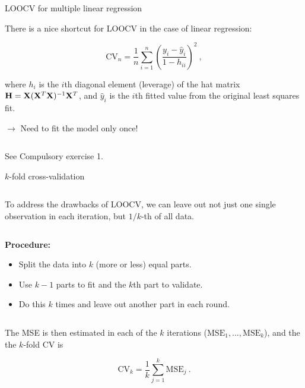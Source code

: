 \documentclass[10pt,ignorenonframetext,]{beamer}
\providecommand{\tightlist}{%
  \setlength{\itemsep}{0pt}\setlength{\parskip}{0pt}}
\begin{document}
\begin{frame}

\begin{block}{LOOCV for multiple linear regression}

\vspace{2mm}

There is a nice shortcut for LOOCV in the case of linear regression:

\[ \text{CV}_{n}=\frac{1}{n}\sum_{i=1}^n \left( \frac{y_i-\hat{y}_i}{1-h_{ii}} \right) ^2 \ ,\]

where \(h_i\) is the \(i\)th diagonal element (leverage) of the hat
matrix \({\bf H}={\bf X}({\bf X}^T{\bf X})^{-1}{\bf X}^T\), and
\(\hat{y}_i\) is the \(i\)th fitted value from the original least
squares fit.

\vspace{2mm}

\(\rightarrow\) Need to fit the model only once!

\(~\)

See Compulsory exercise 1.

\end{block}

\end{frame}

\begin{frame}

\begin{block}{\(k\)-fold cross-validation}

\(~\)

To address the drawbacks of LOOCV, we can leave out not just one single
observation in each iteration, but \(1/k\)-th of all data.

\(~\)

\textbf{Procedure:}

\begin{itemize}
\tightlist
\item
  Split the data into \(k\) (more or less) equal parts.
\end{itemize}

\vspace{2mm}

\begin{itemize}
\tightlist
\item
  Use \(k-1\) parts to fit and the \(k\)th part to validate.
\end{itemize}

\vspace{2mm}

\begin{itemize}
\tightlist
\item
  Do this \(k\) times and leave out another part in each round.
\end{itemize}

\(~\)

The MSE is then estimated in each of the \(k\) iterations
(\(\text{MSE}_1,\ldots,\text{MSE}_k\)), and the the \(k\)-fold CV is

\[\text{CV}_k = \frac1k \sum_{j=1}^k \text{MSE}_j \ .\]

\end{block}

\end{frame}
\end{document}
